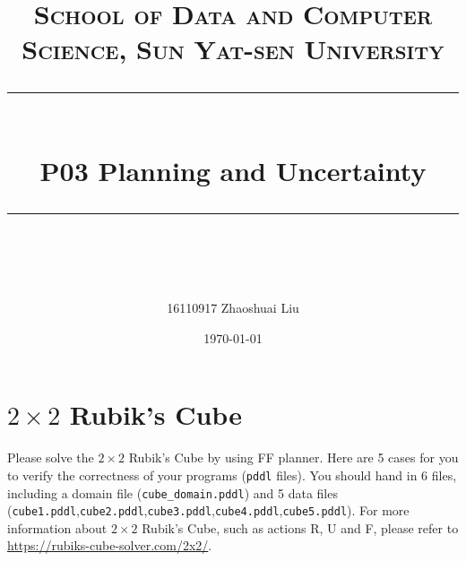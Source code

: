 ﻿\documentclass[a4paper, 11pt]{article}
\title{	
\normalfont \normalsize
\textsc{School of Data and Computer Science, Sun Yat-sen University} \\ [25pt] %
\rule{\textwidth}{0.5pt} \\[0.4cm] %
\huge  P03 Planning and Uncertainty\\ %
\rule{\textwidth}{2pt} \\[0.5cm] %
\author{16110917 Zhaoshuai Liu}
\date{\normalsize\today}
}
\begin{document}
\maketitle
\tableofcontents
\newpage
\section{$2\times 2$ Rubik's Cube}
Please solve the $2\times 2$ Rubik's Cube by using FF planner. Here are 5 cases for you to verify the correctness of your programs (\texttt{pddl} files). You should hand in 6 files, including a domain file (\texttt{cube\_domain.pddl}) and 5 data files (\texttt{cube1.pddl},\texttt{cube2.pddl},\texttt{cube3.pddl},\texttt{cube4.pddl},\texttt{cube5.pddl}).
 For more information about $2\times 2$ Rubik's Cube, such as actions R, U and F, please refer to \url{https://rubiks-cube-solver.com/2x2/}.
 
\end{document}
